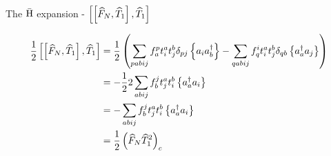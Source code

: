 \begin{frame}{The $\bar{\mathrm{H}}$ expansion - $\left[ \left[ \widehat{F}_N, \widehat{T}_1 \right], \widehat{T}_1 \right]$}

    \small
    \begin{align*}
        \frac{1}{2} \left[ \left[ \widehat{F}_N, \widehat{T}_1 \right], \widehat{T}_1\right] 
        &= \frac{1}{2} \left(\sum_{pabij} f_a^p t_i^a t_j^b \delta_{pj} \left\{a_i a_b^\dagger\right\}
            - \sum_{qabij} f_q^i t_i^a t_j^b \delta_{qb} \left\{a_a^\dagger a_j\right\}\right) \\
        &= -\frac{1}{2} 2 \sum_{abij} f_b^j t_j^a t_i^b \left\{a_a^\dagger a_i\right\} \\
        &= -\sum_{abij} f_b^j t_j^a t_i^b \left\{a_a^\dagger a_i\right\} \\
        &= \frac{1}{2} \left(  \widehat{F}_N \widehat{T}_1^2 \right)_c
    \end{align*}

\end{frame}

    
